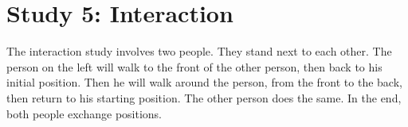 \section{Study 5: Interaction}
\label{sec:studies_interaction}

The interaction study involves two people. They stand next to each other. The person on the left will walk to the front of the other person, then back to his initial position. Then he will walk around the person, from the front to the back, then return to his starting position. The other person does the same. In the end, both people exchange positions.


